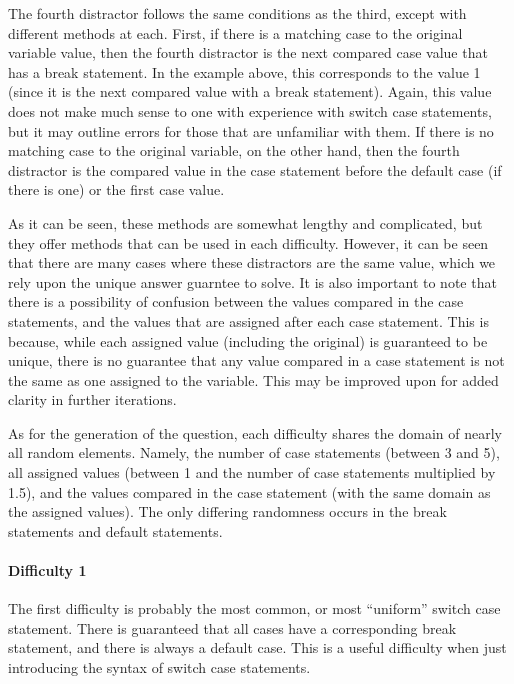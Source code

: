 \documentclass{article}
\begin{document}
The fourth distractor follows the same conditions as the third, except with different methods at each. First, if there is a matching case to the original variable value, then the fourth distractor
is the next compared case value that has a break statement. In the example above, this corresponds to the value 1 (since it is the next compared value with a break statement). Again, this
value does not make much sense to one with experience with switch case statements, but it may outline errors for those that are unfamiliar with them. If there is no matching case to the 
original variable, on the other hand, then the fourth distractor is the compared value in the case statement before the default case (if there is one) or the first case value. 

As it can be seen, these methods are somewhat lengthy and complicated, but they offer methods that can be used in each difficulty. However, it can be seen that there are many cases where 
these distractors are the same value, which we rely upon the unique answer guarntee to solve. It is also important to note that there is a possibility of confusion between the values compared 
in the case statements, and the values that are assigned after each case statement. This is because, while each assigned value (including the original) is guaranteed to be unique, there is no
guarantee that any value compared in a case statement is not the same as one assigned to the variable. This may be improved upon for added clarity in further iterations. 

As for the generation of the question, each difficulty shares the domain of nearly all random elements. Namely, the number of case statements (between 3 and 5), all 
assigned values (between 1 and the number of case statements multiplied by 1.5), and the values compared in the case statement (with the same domain as the assigned values). The only 
differing randomness occurs in the break statements and default statements.

\paragraph{Difficulty 1} \hfill \par

The first difficulty is probably the most common, or most ``uniform'' switch case statement. There is guaranteed that all cases have a corresponding break statement, and there is always a
default case. This is a useful difficulty when just introducing the syntax of switch case statements.
\end{document}
